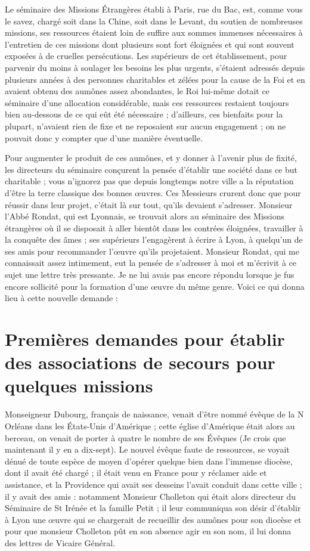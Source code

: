 \documentclass[11pt,a4paper]{report}
\begin{document}
Le séminaire des Missions Étrangères établi à Paris, rue du Bac, est, comme vous le savez, chargé soit dans la Chine, soit dans le Levant, du soutien de nombreuses missions, ses ressources étaient loin de suffire aux sommes immenses nécessaires à l'entretien de ces missions dont plusieurs sont fort éloignées et qui sont souvent exposées à de cruelles persécutions. Les supérieurs de cet établissement, pour parvenir du moins à soulager les besoins les plus urgents, s'étaient adressés depuis plusieurs années à des personnes charitables et zélées pour la cause de la Foi et en avaient obtenu des aumônes assez abondantes, le Roi lui-même dotait ce séminaire d'une allocation considérable, mais ces ressources restaient toujours bien au-dessous de ce qui eût été nécessaire ; d'ailleurs, ces bienfaits pour la plupart, n'avaient rien de fixe et ne reposaient sur aucun engagement ; on ne pouvait donc y compter que d'une manière éventuelle.

Pour augmenter le produit de ces aumônes, et y donner à l'avenir plus de fixité, les directeurs du séminaire conçurent la pensée d'établir une société dans ce but charitable ; vous n'ignorez pas que depuis longtemps notre ville a la réputation d'être la terre classique des bonnes œuvres. Ces Messieurs crurent donc que pour réussir dans leur projet, c'était là sur tout, qu'ils devaient s'adresser. Monsieur l'Abbé Rondat, qui est Lyonnais, se trouvait alors au séminaire des Missions étrangères où il se disposait à aller bientôt dans les contrées éloignées, travailler à la conquête des âmes ; ses supérieurs l'engagèrent à écrire à Lyon, à quelqu'un de ses amis pour recommander l'œuvre qu'ils projetaient. Monsieur Rondat, qui me connaissait assez intimement, eut la pensée de s'adresser à moi et m'écrivit à ce sujet une lettre très pressante. Je ne lui avais pas encore répondu lorsque je fus encore sollicité pour la formation d'une œuvre du même genre. Voici ce qui donna lieu à cette nouvelle demande :

\section*{Premières demandes pour établir des associations de secours pour quelques missions}

Monseigneur Dubourg, français de naissance, venait d'être nommé évêque de la N Orléans dans les États-Unis d'Amérique ; cette église d'Amérique était alors au berceau, on venait de porter à quatre le nombre de ses Évêques (Je crois que maintenant il y en a dix-sept). Le nouvel évêque faute de ressources, se voyait dénué de toute espèce de moyen d'opérer quelque bien dans l'immense diocèse, dont il avait été chargé ; il était venu en France pour y réclamer aide et assistance, et la Providence qui avait ses desseins l'avait conduit dans cette ville ; il y avait des amis : notamment Monsieur Cholleton qui était alors directeur du Séminaire de St Irénée et la famille Petit ; il leur communiqua son désir d'établir à Lyon une œuvre qui se chargerait de recueillir des aumônes pour son diocèse et pour que monsieur Cholleton pût en son absence agir en son nom, il lui donna des lettres de Vicaire Général.
\end{document}
